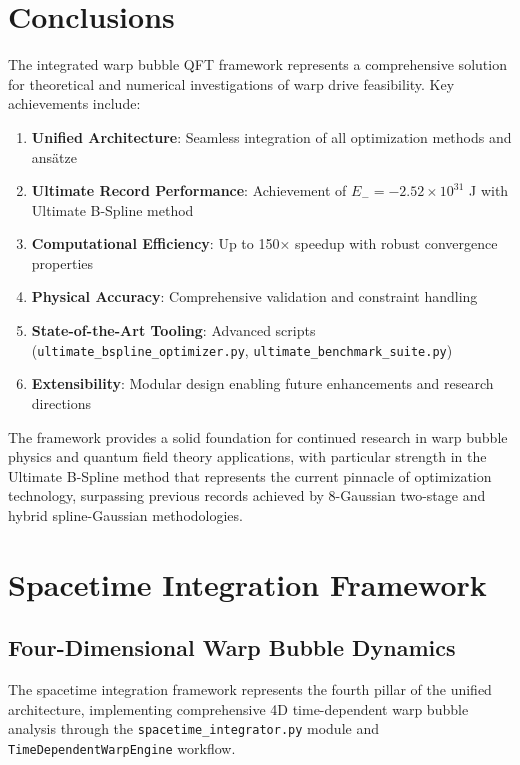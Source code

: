 \documentclass[12pt]{article}
\begin{document}
\section{Conclusions}

The integrated warp bubble QFT framework represents a comprehensive solution for theoretical and numerical investigations of warp drive feasibility. Key achievements include:

\begin{enumerate}
\item \textbf{Unified Architecture}: Seamless integration of all optimization methods and ansätze
\item \textbf{Ultimate Record Performance}: Achievement of $E_- = -2.52\times10^{31}$ J with Ultimate B-Spline method
\item \textbf{Computational Efficiency}: Up to 150× speedup with robust convergence properties
\item \textbf{Physical Accuracy}: Comprehensive validation and constraint handling
\item \textbf{State-of-the-Art Tooling}: Advanced scripts (\texttt{ultimate_bspline_optimizer.py}, \texttt{ultimate_benchmark_suite.py})
\item \textbf{Extensibility}: Modular design enabling future enhancements and research directions
\end{enumerate}

The framework provides a solid foundation for continued research in warp bubble physics and quantum field theory applications, with particular strength in the Ultimate B-Spline method that represents the current pinnacle of optimization technology, surpassing previous records achieved by 8-Gaussian two-stage and hybrid spline-Gaussian methodologies.

\section{Spacetime Integration Framework}

\subsection{Four-Dimensional Warp Bubble Dynamics}

The spacetime integration framework represents the fourth pillar of the unified architecture, implementing comprehensive 4D time-dependent warp bubble analysis through the \texttt{spacetime_integrator.py} module and \texttt{TimeDependentWarpEngine} workflow.
\end{document}

